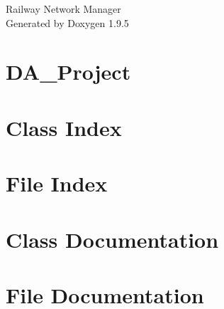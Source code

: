 \documentclass[twoside]{book}
\newcommand{\+}{\discretionary{\mbox{\scriptsize$\hookleftarrow$}}{}{}}
\newcommand{\clearemptydoublepage}{%
    \newpage{\pagestyle{empty}\cleardoublepage}%
  }
\begin{document}
  \raggedbottom
    \hypersetup{pageanchor=false,
                bookmarksnumbered=true,
                pdfencoding=unicode
               }
  \begin{titlepage}
  \vspace*{7cm}
  \begin{center}%
  {\Large Railway Network Manager}\\
  \vspace*{1cm}
  {\large Generated by Doxygen 1.9.5}\\
  \end{center}
  \end{titlepage}
  \clearemptydoublepage
  \tableofcontents
  \clearemptydoublepage
  \hypersetup{pageanchor=true}
\chapter{DA\+\_\+\+Project}
\label{md__r_e_a_d_m_e}

\chapter{Class Index}

\chapter{File Index}

\chapter{Class Documentation}









\chapter{File Documentation}













  \backmatter
  \newpage
  \clearemptydoublepage
  \printindex
\end{document}
